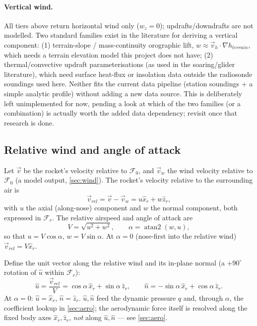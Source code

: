 \paragraph{Vertical wind.} All tiers above return horizontal wind only ($w_z=0$);
updrafts/downdrafts are not modelled. Two standard families exist in the literature for deriving a
vertical component: (1) terrain-slope / mass-continuity orographic lift, $w\approx\vec{v}_h\cdot
\nabla h_{terrain}$, which needs a terrain elevation model this project does not have; (2)
thermal/convective updraft parameterisations (as used in the soaring/glider literature), which need
surface heat-flux or insolation data outside the radiosonde soundings used here. Neither fits the
current data pipeline (station soundings + a simple analytic profile) without adding a new data
source. This is deliberately left unimplemented for now, pending a look at which of the two
families (or a combination) is actually worth the added data dependency; revisit once that
research is done.

\subsection{Relative wind and angle of attack}\label{sec:relwind}
Let $\vec{v}$ be the rocket's velocity relative to $\mathcal{F}_0$, and $\vec{v}_w$ the wind
velocity relative to $\mathcal{F}_0$ (a model output, \autoref{sec:wind}). The rocket's velocity
relative to the surrounding air is
\begin{equation}
    \vec{v}_{rel} = \vec{v} - \vec{v}_w = u\hat{x}_r + w\hat{z}_r,
\end{equation}
with $u$ the axial (along-nose) component and $w$ the normal component, both expressed in
$\mathcal{F}_r$. The relative airspeed and angle of attack are
\begin{equation}
    V = \sqrt{u^2+w^2}, \qquad \alpha = \operatorname{atan2}(w, u),
\end{equation}
so that $u=V\cos\alpha$, $w=V\sin\alpha$. At $\alpha=0$ (nose-first into the relative wind)
$\vec{v}_{rel}=V\hat{x}_r$.

Define the unit vector along the relative wind and its in-plane normal (a $+90^\circ$ rotation of
$\hat{u}$ within $\mathcal{F}_r$):
\begin{equation}
    \hat{u} = \frac{\vec{v}_{rel}}{V} = \cos\alpha\,\hat{x}_r + \sin\alpha\,\hat{z}_r, \qquad
    \hat{n} = -\sin\alpha\,\hat{x}_r + \cos\alpha\,\hat{z}_r.
\end{equation}
At $\alpha=0$: $\hat{u}=\hat{x}_r$, $\hat{n}=\hat{z}_r$. $\hat{u},\hat{n}$ feed the dynamic pressure
$q$ and, through $\alpha$, the coefficient lookup in \autoref{sec:aero}; the aerodynamic force
itself is resolved along the fixed body axes $\hat{x}_r,\hat{z}_r$, \emph{not} along
$\hat{u},\hat{n}$ --- see \autoref{sec:aero}.

